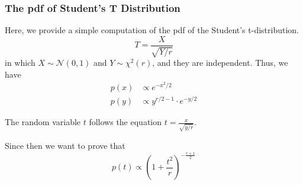 \subsubsection{The pdf of Student's T Distribution}

Here, we provide a simple computation of the pdf of the Student's t-distribution.
\begin{equation*}
    T=\frac{X}{\sqrt{Y/r}}
\end{equation*}
in which $X \sim \mathcal{N}(0, 1)$ and $Y \sim \chi^2(r)$, and they are independent.
Thus, we have
\begin{align*}
    p(x) & \propto e^{-x^2/2}               \\
    p(y) & \propto y^{r/2-1} \cdot e^{-y/2}
\end{align*}

The random variable $t$ follows the equation $t=\frac{x}{\sqrt{y/r}}$.

\begin{lemma} \label{lemma: Compute the Pdf of Student's T Distribution}
    Since then we want to prove that
    \begin{equation}
        p(t) \propto (1+\frac{t^2}{r})^{-\frac{r+1}{2}}
    \end{equation}

\end{lemma}

